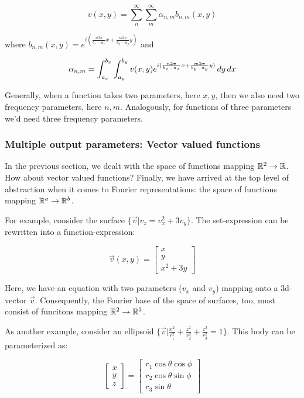 $$ v(x, y) = \sum_n^\infty \sum_m^\infty \alpha_{n,m} b_{n,m}(x, y) $$

where $b_{n,m}(x, y) = e^{i( \frac{n 2 \pi}{b_x - a_x} x + \frac{m 2 \pi}{b_y - a_y} y)}$ and  

$$ \alpha_{n,m} = \int_{a_x}^{b_x} \int_{a_y}^{b_y} v(x, y) e^{i( \frac{n 2 \pi}{b_x - a_x} x + \frac{m 2 \pi}{b_y - a_y} y)} \mathop{dy} \mathop{dx}$$

Generally, when a function takes two parameters, here $x,y$, then we also need two frequency parameters, here $n,m$. Analogously, for functions of three parameters we'd need three frequency parameters.


\subsubsection{Multiple output parameters: Vector valued functions}
In the previous section, we dealt with the space of functions mapping $\mathbb{R}^2 \to \mathbb{R}$. How about vector valued functions? Finally, we have arrived at the top level of abstraction when it comes to Fourier representations: the space of functions mapping $\mathbb{R}^a \to \mathbb{R}^b$. 

For example, consider the surface $\{ \vec{v} | v_z = v_x^2 + 3 v_y \}$. The set-expression can be rewritten into a function-expression: 

$$\vec{v}(x,y) = 
\begin{bmatrix} 
x \\
y \\
x^2 + 3 y
\end{bmatrix}$$

Here, we have an equation with two parameters ($v_x$ and $v_y$) mapping onto a 3d-vector $\vec{v}$. Consequently, the Fourier base of the space of surfaces, too, must consist of funcitons mapping $\mathbb{R}^2 \to \mathbb{R}^3$. 

As another example, consider an ellipsoid $\{\vec{v} | \frac{x^2}{r_1^2} + \frac{z^2}{r_2^2} + \frac{z^2}{r_3^2} = 1 \}$. This body can be parameterized as: 

$$ \begin{bmatrix}
x \\
y \\
z
\end{bmatrix} = 
\begin{bmatrix}
r_1 \cos{\theta} \cos{\phi} \\
r_2 \cos{\theta} \sin{\phi} \\
r_3 \sin{\theta}
\end{bmatrix} $$

